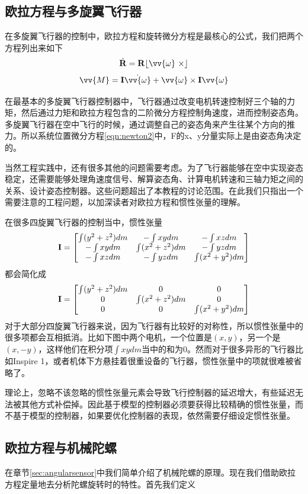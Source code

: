 \documentclass[11pt]{article}
\begin{document}
\subsection{欧拉方程与多旋翼飞行器}
在多旋翼飞行器的控制中，欧拉方程和旋转微分方程是最核心的公式，我们把两个方程列出来如下
$$
\dot{{\bf R}} = {\bf R}\lfloor \vv{\omega} \ \times \rfloor
$$
$$
\vv{M} = {\bf I}\dot{\vv{\omega}} + \vv{\omega} \times {\bf I}\vv{\omega}
$$

在最基本的多旋翼飞行器控制器中，飞行器通过改变电机转速控制好三个轴的力矩，然后通过力矩和欧拉方程包含的二阶微分方程控制角速度，进而控制姿态角。多旋翼飞行器在空中飞行的时候，通过调整自己的姿态角来产生往某个方向的推力。所以系统位置微分方程\ref{eqn:newton2}中，F的x、y分量实际上是由姿态角决定的。

当然工程实践中，还有很多其他的问题需要考虑。为了飞行器能够在空中实现姿态稳定，还需要能够处理角速度信号、解算姿态角、计算电机转速和三轴力矩之间的关系、设计姿态控制器。这些问题超出了本教程的讨论范围。在此我们只指出一个需要注意的工程问题，以加深读者对欧拉方程和惯性张量的理解。

在很多四旋翼飞行器的控制当中，惯性张量
$$
{\bf I} = 
\begin{bmatrix}
\int (y^2+z^2) dm	&	-\int xy dm		&	-\int xz dm	\\
-\int xy dm		&	\int (x^2+z^2) dm	&	-\int yz dm	\\
-\int xz dm		&	-\int yz dm		&	\int (x^2+y^2) dm
\end{bmatrix}
$$
都会简化成
$$
{\bf I} = 
\begin{bmatrix}
\int (y^2+z^2) dm	&	0		&	0	\\
0		&	\int (x^2+z^2) dm	&	0	\\
0		&	0		&	\int (x^2+y^2) dm
\end{bmatrix}
$$
对于大部分四旋翼飞行器来说，因为飞行器有比较好的对称性，所以惯性张量中的很多项都会互相抵消。比如下图中两个电机，一个位置是$(x,y)$，另一个是$(x,-y)$，这样他们在积分项$\int xy dm$当中的和为0。然而对于很多异形的飞行器比如Inspire 1，或者机体下方悬挂着很重设备的飞行器，惯性张量中的项就很难被省略了。

理论上，忽略不该忽略的惯性张量元素会导致飞行控制器的延迟增大，有些延迟无法被其他方式补偿掉。因此基于模型的控制器必须要获得比较精确的惯性张量，而不基于模型的控制器，如果要优化控制器的表现，依然需要仔细设定惯性张量。

\subsection{欧拉方程与机械陀螺}\label{sec:eulereqngyro}
在章节\ref{sec:angularsensor}中我们简单介绍了机械陀螺的原理。现在我们借助欧拉方程定量地去分析陀螺旋转时的特性。首先我们定义
\end{document}
